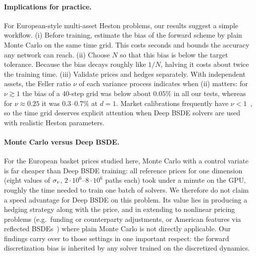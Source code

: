 \paragraph{Implications for practice.} For European-style multi-asset Heston problems, our results suggest a simple workflow. (i) Before training, estimate the bias of the forward scheme by plain Monte Carlo on the same time grid. This costs seconds and bounds the accuracy any network can reach. (ii) Choose $N$ so that this bias is below the target tolerance. Because the bias decays roughly like $1/N$, halving it costs about twice the training time. (iii) Validate prices and hedges separately. With independent assets, the Feller ratio $\nu$ of each variance process indicates when (ii) matters: for $\nu\gtrsim1$ the bias of a 40-step grid was below about $0.05\%$ in all our tests, whereas for $\nu\approx0.25$ it was $0.3$--$0.7\%$ at $d=1$. Market calibrations frequently have $\nu<1$~\cite{albrecher2007little,andersen2008simple}, so the time grid deserves explicit attention when Deep BSDE solvers are used with realistic Heston parameters.

\paragraph{Monte Carlo versus Deep BSDE.} For the European basket prices studied here, Monte Carlo with a control variate is far cheaper than Deep BSDE training: all reference prices for one dimension (eight values of $\sigma_v$, $2\cdot10^6$--$8\cdot10^6$ paths each) took under a minute on the GPU, roughly the time needed to train one batch of solvers. We therefore do not claim a speed advantage for Deep BSDE on this problem. Its value lies in producing a hedging strategy along with the price, and in extending to nonlinear pricing problems (e.g.\ funding or counterparty adjustments, or American features via reflected BSDEs~\cite{chen2021deep,negyesi2026deep}) where plain Monte Carlo is not directly applicable. Our findings carry over to those settings in one important respect: the forward discretization bias is inherited by any solver trained on the discretized dynamics.

